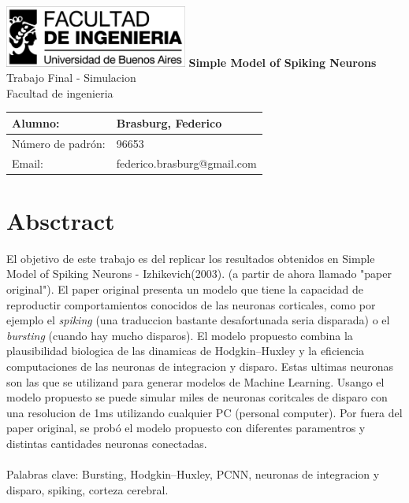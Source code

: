 \documentclass[12pt]{article}
\begin{document}
\begin{titlepage} %
	\hfill\includegraphics[width=6cm]{images/logofiuba.jpg}
    \centering
    \vfill
    \Huge \textbf{Simple Model of Spiking Neurons}
    \vskip2cm
    \Large Trabajo Final - Simulacion \\
    Facultad de ingenieria\\ %
    \vskip2cm
    \begin{tabular}{ | l | l | } %
      \hline
      Alumno: & Brasburg, Federico \\ \hline
      Número de padrón: & 96653 \\ \hline
      Email: & federico.brasburg@gmail.com \\ \hline
    \end{tabular}
    \vskip2cm
    \vfill
    \vfill
\end{titlepage}

\tableofcontents %
\newpage

\section{Absctract}\label{sec:intro}
El objetivo de este trabajo es del replicar los resultados obtenidos en Simple Model of Spiking Neurons - Izhikevich(2003). \cite{paperOriginal} (a partir de ahora llamado "paper original").
El paper original presenta un modelo que tiene la capacidad de reproductir comportamientos conocidos de las neuronas corticales, como por ejemplo el \textit{spiking} (una traduccion bastante desafortunada seria disparada)
o el \textit{bursting} (cuando hay mucho disparos). El modelo propuesto combina la plausibilidad biologica de las dinamicas de Hodgkin–Huxley \cite{HodgkinHuxley} y la eficiencia computaciones de las neuronas de integracion y disparo.
Estas ultimas neuronas son las que se utilizand para generar modelos de Machine Learning. Usango el modelo propuesto se puede simular miles de neuronas coritcales de disparo con una resolucion de 1ms utilizando cualquier PC (personal computer).
Por fuera del paper original, se probó el modelo propuesto con diferentes paramentros y distintas cantidades neuronas conectadas.
\\ \\
Palabras clave: Bursting, Hodgkin–Huxley, PCNN, neuronas de integracion y disparo, spiking, corteza cerebral.
\newpage
\end{document}
